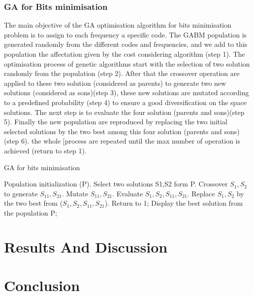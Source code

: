 \documentclass[preprint,12pt]{elsarticle}
\begin{document}
\subsubsection{GA for Bits minimisation}
The main objective of the GA optimisation algorithm for bits minimisation problem is to assign to each frequency a specific code. The GABM population is generated randomly from the different codes and frequencies, and we add to this population the affectation given by the cost considering algorithm (step 1). The optimisation process of genetic algorithms start with the selection of two solution randomly from the population (step 2). After that the crossover operation are applied to these two solution (considered as parents) to generate two new solutions (considered as sons)(step 3), these new solutions are mutated according to a predefined probability (step 4) to ensure a good diversification on the space solutions. The next step is to evaluate the four solution (parents and sons)(step 5). Finally the new population are reproduced by replacing the two initial selected solutions by the two best among this four solution (parents and sons) (step 6). the whole [process are repeated until the max number of operation is achieved (return to step 1). 
\begin{algorithm}
\caption{GA for bits minimisation}
\begin{algorithmic}[1]
\State Population initialization (P).
\State Select two solutions S1,S2 form P.
\State Crossover $S_{1},S_{2}$ to generate $S_{11},S_{21}$.
\State Mutate $S_{11},S_{21}$.
\State Evaluate $S_{1},S_{2},S_{11},S_{21}$.
\State Replace $S_{1},S_{2}$ by the two best from ($S_{1},S_{2},S_{11},S_{21}$).
\State Return to 1;
\EndWhile
\State Display the best solution from the population P;
\end{algorithmic}
\end{algorithm}


\section{Results And Discussion}
\section{Conclusion}



\end{document}
